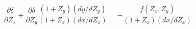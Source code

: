 \begin{equation}\label{corr1}
\frac{\partial \delta}{\partial Z_x}+\frac{\partial
\delta}{\partial
Z_y}\frac{(1+Z_y)(dy/dZ_y)}{(1+Z_x)(dx/dZ_x)}=-\frac{f(Z_x,
Z_y)}{(1+Z_x)(dx/dZ_x)}
\end{equation}

